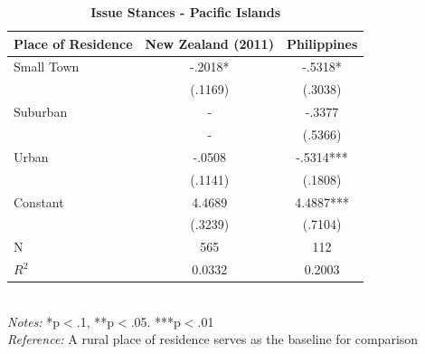 \documentclass[12pt, titlepage]{article}
\newcommand\e{\emph}
\newcommand\tb{\textbf}
\begin{document}
\begin{singlespace}
	\begin{table}[H]
		\centering
		\caption{\tb{Issue Stances - Pacific Islands}}
		\begin{tabulary}{\linewidth}{l c c }

			\hline
			\tb{Place of Residence}&\tb{New Zealand (2011)}&\tb{Philippines}\\
			\hline
			Small Town&-.2018*&-.5318* \\
			&(.1169)&(.3038) \\
			Suburban&- &-.3377 \\
			&-&(.5366) \\
			Urban&-.0508&-.5314*** \\
			&(.1141)& (.1808)\\
			Constant& 4.4689&4.4887*** \\
			&(.3239)& (.7104) \\
			N&565&112 \\
			$R^2$&0.0332& 0.2003 \\
			\hline
\end{tabulary}
\\
\e{Notes:} *p$<$.1, **p$<$.05. ***p$<$.01 \\
\e{Reference:} A rural place of residence serves as the baseline for comparison
\label{PacificLib}
\end{table}
\end{singlespace}
\end{document}
